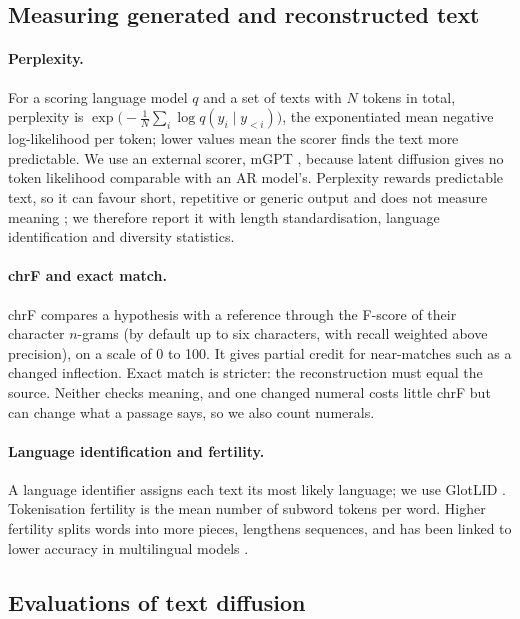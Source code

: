 \documentclass[11pt,a4paper]{article}
\begin{document}
\subsection{Measuring generated and reconstructed text}

\paragraph{Perplexity.} For a scoring language model $q$ and a set of texts with $N$ tokens in total, perplexity is $\exp\bigl(-\frac{1}{N}\sum_i \log q(y_i\mid y_{<i})\bigr)$, the exponentiated mean negative log-likelihood per token; lower values mean the scorer finds the text more predictable. We use an external scorer, mGPT \citep{shliazhko2024mgpt}, because latent diffusion gives no token likelihood comparable with an AR model's. Perplexity rewards predictable text, so it can favour short, repetitive or generic output and does not measure meaning \citep{holtzman2020curious}; we therefore report it with length standardisation, language identification and diversity statistics.

\paragraph{chrF and exact match.} chrF \citep{popovic2015chrf} compares a hypothesis with a reference through the F-score of their character $n$-grams (by default up to six characters, with recall weighted above precision), on a scale of 0 to 100. It gives partial credit for near-matches such as a changed inflection. Exact match is stricter: the reconstruction must equal the source. Neither checks meaning, and one changed numeral costs little chrF but can change what a passage says, so we also count numerals.

\paragraph{Language identification and fertility.} A language identifier assigns each text its most likely language; we use GlotLID \citep{kargaran2023glotlid}. Tokenisation fertility is the mean number of subword tokens per word. Higher fertility splits words into more pieces, lengthens sequences, and has been linked to lower accuracy in multilingual models \citep{rust2021good,lundin2025token}.

\subsection{Evaluations of text diffusion}
\label{sec:related}
\end{document}

